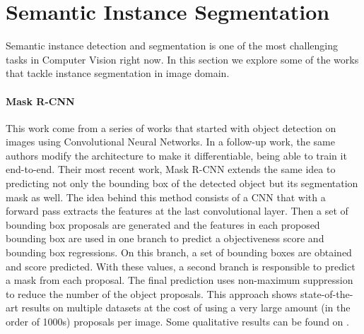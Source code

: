 

\section{Semantic Instance Segmentation}
\label{sec:soa:instancesegmentation}

Semantic instance detection and segmentation is one of the most challenging tasks in Computer Vision right now.
In this section we explore some of the works that tackle instance segmentation in image domain. 

\paragraph{Mask R-CNN~\maskrcnn}
This work come from a series of works that started with object detection on images using Convolutional Neural Networks.
In a follow-up work, the same authors modify the architecture to make it differentiable, being able to train it end-to-end.
Their most recent work, Mask R-CNN extends the same idea to predicting not only the bounding box of the detected object but its segmentation mask as well.
The idea behind this method consists of a CNN that with a forward pass extracts the features at the last convolutional layer.
Then a set of bounding box proposals are generated and the features in each proposed bounding box are used in one branch to predict a objectiveness score and bounding box regressions.
On this branch, a set of bounding boxes are obtained and score predicted. With these values, a second branch is responsible to predict a mask from each proposal.
The final prediction uses non-maximum suppression to reduce the number of the object proposals.
This approach shows state-of-the-art results on multiple datasets at the cost of using a very large amount (in the order of 1000s) proposals per image.
Some qualitative results can be found on .

